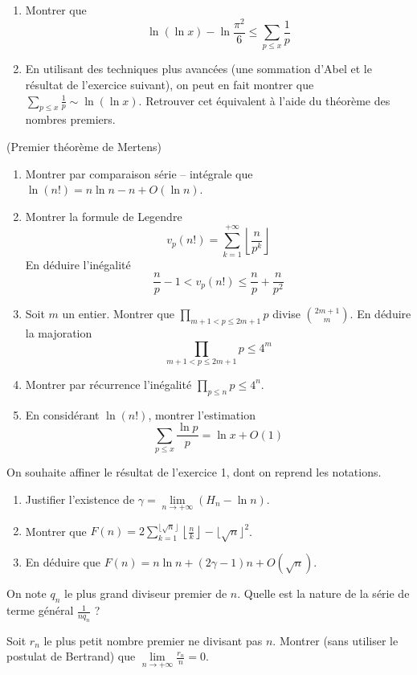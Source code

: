 \begin{exo}
\begin{enumerate}
	\item Montrer que
	\[ \ln(\ln x) - \ln \frac{\pi^2}{6} \leq \sum_{p \leq x} \frac{1}{p} \]
	\item En utilisant des techniques plus avancées (une sommation d'Abel et le résultat de l'exercice suivant), on peut en fait montrer que $\sum_{p \leq x} \frac{1}{p} \sim \ln(\ln x)$. Retrouver cet équivalent à l'aide du théorème des nombres premiers.
\end{enumerate}

\end{exo}


\begin{exo}(Premier théorème de Mertens)
\begin{enumerate}
	\item Montrer par comparaison série -- intégrale que $\ln(n!) = n \ln n - n + O(\ln n)$.
	\item Montrer la formule de Legendre
	\[ v_p(n!) = \sum_{k=1}^{+\infty} \left\lfloor \frac{n}{p^k} \right\rfloor \]
	En déduire l'inégalité
	\[ \frac{n}{p}-1 < v_p(n!) \leq \frac{n}{p} + \frac{n}{p^2}\]
	\item Soit $m$ un entier. Montrer que $\displaystyle\prod_{m+1<p\leq 2m+1} p$ divise $\binom{2m+1}{m}$. En déduire la majoration
	\[ \displaystyle\prod_{m+1<p\leq 2m+1} p \leq 4^m\]
	\item Montrer par récurrence l'inégalité $\displaystyle\prod_{p\leq n} p \leq 4^n$.
	\item En considérant $\ln(n!)$, montrer l'estimation
	\[ \sum_{p \leq x} \frac{\ln p}{p} = \ln x + O(1) \]
\end{enumerate}
\end{exo}


\begin{exo}
On souhaite affiner le résultat de l'exercice 1, dont on reprend les notations.
\begin{enumerate}
	\item Justifier l'existence de $\gamma = \lim\limits_{n \rightarrow +\infty} \left(H_n - \ln n \right)$.
	\item Montrer que $F(n) = 2 \displaystyle\sum_{k=1}^{\lfloor \sqrt{n} \rfloor} \left\lfloor \frac{n}{k} \right\rfloor - \lfloor \sqrt{n} \rfloor^2$.
	\item En déduire que $F(n) = n \ln n + (2\gamma - 1)n + O(\sqrt{n})$.
\end{enumerate}
\end{exo}


\begin{exo}
On note $q_n$ le plus grand diviseur premier de $n$.\newline
Quelle est la nature de la série de terme général $\frac{1}{nq_n}$ ?
\end{exo}


\begin{exo}
Soit $r_n$ le plus petit nombre premier ne divisant pas $n$.\newline
Montrer (sans utiliser le postulat de Bertrand) que $\lim\limits_{n \rightarrow +\infty} \frac{r_n}{n} = 0$.
\end{exo}